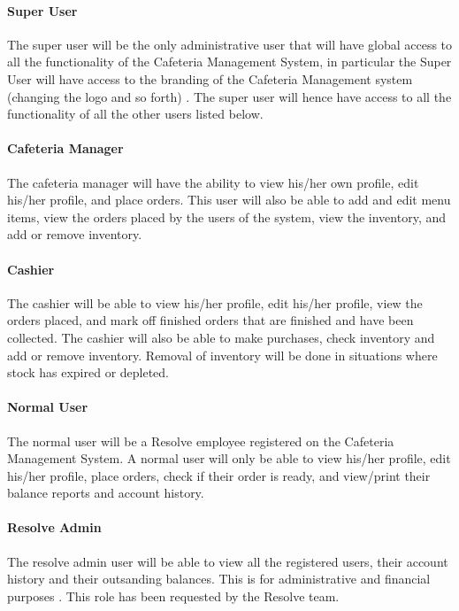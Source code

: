 \documentclass[12pt]{article}
\begin{document}
\paragraph{Super User\\}
The super user will be the only administrative user that will have global access to all the functionality of the Cafeteria Management System, in particular the Super User will have access to the branding of the Cafeteria Management system (changing the logo and so forth) . The super user will hence have access to all the functionality of all the other users listed below.

\paragraph{ Cafeteria Manager\\}
The cafeteria manager will have the ability to view his/her own profile, edit his/her profile, and place orders. This user will also be able to add and edit menu items, view the orders placed by the users of the system, view the inventory, and add or remove inventory. 

\paragraph{ Cashier\\}
The cashier will be able to view his/her profile, edit his/her profile, view the orders placed, and mark off finished orders that are finished and have been collected. The cashier will also be able to make purchases, check inventory and add or remove inventory. Removal of inventory will be done in situations where stock has expired or depleted.

\paragraph{ Normal User\\}
The normal user will be a Resolve employee registered on the Cafeteria Management System.  A normal user will only be able to view his/her profile, edit his/her profile, place orders, check if their order is ready, and view/print their balance reports and account history.

\paragraph{ Resolve Admin\\}
The resolve admin user will be able to view all the registered users, their account history and their outsanding balances. This is for administrative and financial purposes . This role has been requested by the Resolve team.
\end{document}
